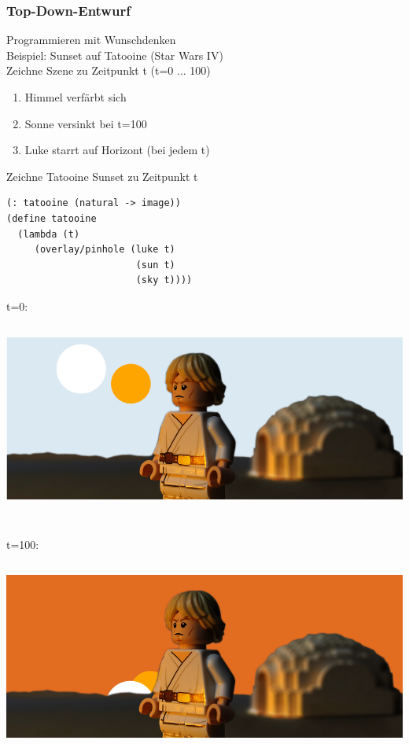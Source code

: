 \documentclass[paper=a4, fontsize=11pt]{scrartcl}
\numberwithin{equation}{section}
\numberwithin{figure}{section}
\numberwithin{table}{section}
\begin{document}
\subsubsection{Top-Down-Entwurf}
Programmieren mit Wunschdenken \\

Beispiel: Sunset auf Tatooine (Star Wars IV) \\
Zeichne Szene zu Zeitpunkt t (t=0 ... 100) 
\begin{enumerate}
\item Himmel verfärbt sich
\item Sonne versinkt bei t=100
\item Luke starrt auf Horizont (bei jedem t)
\end{enumerate}
Zeichne Tatooine Sunset zu Zeitpunkt t
\begin{lstlisting}
(: tatooine (natural -> image))
(define tatooine
  (lambda (t)
     (overlay/pinhole (luke t)
                       (sun t)
                       (sky t))))
\end{lstlisting}

t=0: \\
\includegraphics[width=15cm,height=7cm]{tatooine0.png}

t=100: \\
\includegraphics[width=15cm,height=7cm]{tatooine100.png}
\end{document}
